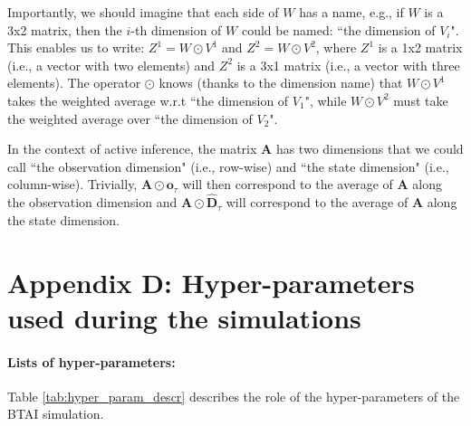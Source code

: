 \documentclass[twoside,11pt]{article}
\begin{document}
Importantly, we should imagine that each side of $W$ has a name, e.g., if $W$ is a 3x2 matrix, then the $i$-th dimension of $W$ could be named: ``the dimension of $V_i$". This enables us to write: $Z^1 = W \odot V^1$ and $Z^2 = W \odot V^2$, where $Z^1$ is a 1x2 matrix (i.e., a vector with two elements) and $Z^2$ is a 3x1 matrix (i.e., a vector with three elements). The operator $\odot$ knows (thanks to the dimension name) that $W \odot V^1$ takes the weighted average w.r.t ``the dimension of $V_1$", while $W \odot V^2$ must take the weighted average over ``the dimension of $V_2$".

In the context of active inference, the matrix $\bm{A}$ has two dimensions that we could call ``the observation dimension" (i.e., row-wise) and ``the state dimension" (i.e., column-wise). Trivially, $\bm{A} \odot \bm{o}_\tau$ will then correspond to the average of $\bm{A}$ along the observation dimension and $\bm{A} \odot \bm{\hat{D}}_\tau$ will correspond to the average of $\bm{A}$ along the state dimension. 

\section*{Appendix D: Hyper-parameters used during the simulations}

\paragraph{Lists of hyper-parameters:}

Table \ref{tab:hyper_param_descr} describes the role of the hyper-parameters of the BTAI simulation.
\end{document}
